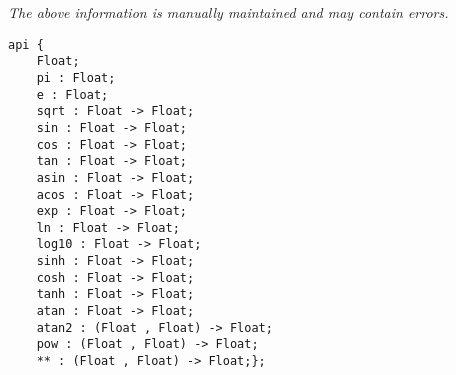 \label{api:Math}

{\tiny \it The above information is manually maintained and may contain errors.}
\begin{verbatim}
api {
    Float;
    pi : Float;
    e : Float;
    sqrt : Float -> Float;
    sin : Float -> Float;
    cos : Float -> Float;
    tan : Float -> Float;
    asin : Float -> Float;
    acos : Float -> Float;
    exp : Float -> Float;
    ln : Float -> Float;
    log10 : Float -> Float;
    sinh : Float -> Float;
    cosh : Float -> Float;
    tanh : Float -> Float;
    atan : Float -> Float;
    atan2 : (Float , Float) -> Float;
    pow : (Float , Float) -> Float;
    ** : (Float , Float) -> Float;};
\end{verbatim}\index[fun]{**}
